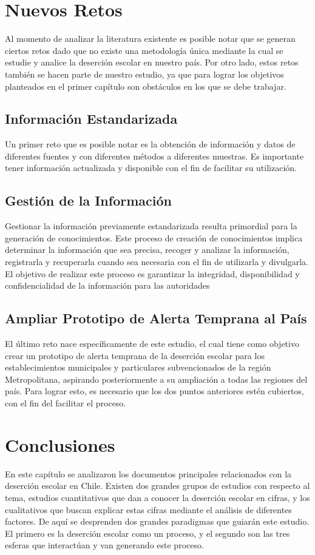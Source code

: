 \section{Nuevos Retos}
Al momento de analizar la literatura existente es posible notar que se generan ciertos retos dado que no existe una metodología única mediante la cual se estudie y analice la deserción escolar en nuestro país. 
Por otro lado, estos retos también se hacen parte de nuestro estudio, ya que para lograr los objetivos planteados en el primer capítulo son obstáculos en los que se debe trabajar. 
\subsection{Información Estandarizada}
Un primer reto que es posible notar es la obtención de información y datos de diferentes fuentes y con diferentes métodos a diferentes muestras. 
Es importante tener información actualizada y disponible con el fin de facilitar su utilización. 
\subsection{Gestión de la Información}
Gestionar la información previamente estandarizada resulta primordial para la generación de conocimientos. Este proceso de creación de conocimientos implica determinar la información que sea precisa, recoger y analizar la información, registrarla y recuperarla cuando sea necesaria con el fin de utilizarla y divulgarla. 
El objetivo de realizar este proceso es garantizar la integridad, disponibilidad y confidencialidad de la información para las autoridades 
\subsection{Ampliar Prototipo de Alerta Temprana al País}
El último reto nace específicamente de este estudio, el cual tiene como objetivo crear un prototipo de alerta temprana de la deserción escolar para los establecimientos municipales y particulares subvencionados de la región Metropolitana, aspirando posteriormente a su ampliación a todas las regiones del país. Para lograr esto, es necesario que los dos puntos anteriores estén cubiertos, con el fin del facilitar el proceso.

\section{Conclusiones}
En este capítulo se analizaron los documentos principales relacionados con la deserción escolar en Chile. Existen dos grandes grupos de estudios con respecto al tema, estudios cuantitativos que dan a conocer la deserción escolar en cifras, y los cualitativos que buscan explicar estas cifras mediante el análisis de diferentes factores. De aquí se desprenden dos grandes paradigmas que guiarán este estudio. El primero es la deserción escolar como un proceso, y el segundo son las tres esferas que interactúan y van generando este proceso. 

